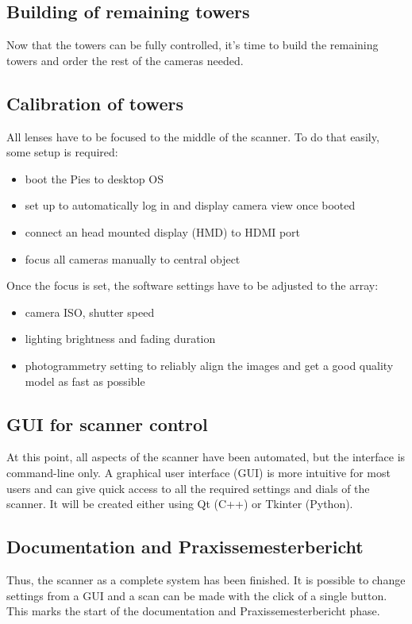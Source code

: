 \subsection{Building of remaining towers}	
	Now that the towers can be fully controlled, it's time to build the remaining towers and order the rest of the cameras needed.
	
\subsection{Calibration of towers}
	All lenses have to be focused to the middle of the scanner. To do that easily, some setup is required:
	\begin{itemize}
		\item boot the Pies to desktop OS
		\item set up to automatically log in and display camera view once booted
		\item connect an head mounted display (HMD) to HDMI port
		\item focus all cameras manually to central object
	\end{itemize}
	Once the focus is set, the software settings have to be adjusted to the array:
	\begin{itemize}
		\item camera ISO, shutter speed
		\item lighting brightness and fading duration
		\item photogrammetry setting to reliably align the images and get a good quality model as fast as possible
	\end{itemize}

\subsection{GUI for scanner control}
	At this point, all aspects of the scanner have been automated, but the interface is command-line only. A graphical user interface (GUI) is more intuitive for most users and can give quick access to all the required settings and dials of the scanner. It will be created either using Qt (C++) or Tkinter (Python).
	
\subsection{Documentation and Praxissemesterbericht}
	Thus, the scanner as a complete system has been finished. It is possible to change settings from a GUI and a scan can be made with the click of a single button. This marks the start of the documentation and Praxissemesterbericht phase.
	
